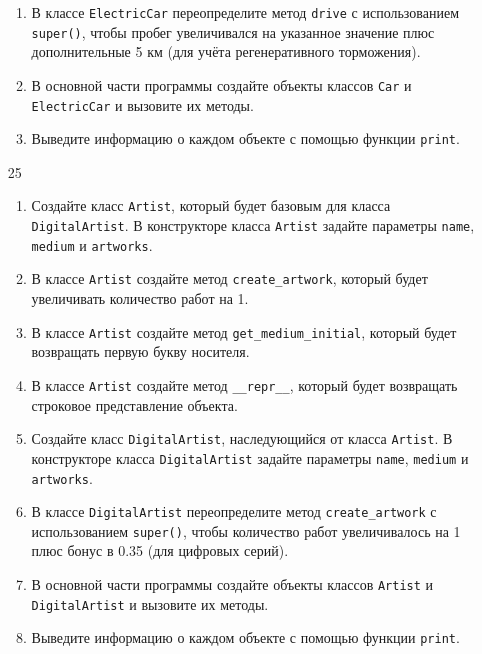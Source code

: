 \begin{enumerate}
\begin{enumerate}[leftmargin=*]
    \item В классе \texttt{ElectricCar} переопределите метод \texttt{drive} с использованием \texttt{super()}, чтобы пробег увеличивался на указанное значение плюс дополнительные 5 км (для учёта регенеративного торможения).
    
    \item В основной части программы создайте объекты классов \texttt{Car} и \texttt{ElectricCar} и вызовите их методы.
    
    \item Выведите информацию о каждом объекте с помощью функции \texttt{print}.
\end{enumerate}

\item[25] 
\begin{enumerate}[leftmargin=*]
    \item Создайте класс \texttt{Artist}, который будет базовым для класса \texttt{DigitalArtist}. В конструкторе класса \texttt{Artist} задайте параметры \texttt{name}, \texttt{medium} и \texttt{artworks}.
    
    \item В классе \texttt{Artist} создайте метод \texttt{create\_artwork}, который будет увеличивать количество работ на 1.
    
    \item В классе \texttt{Artist} создайте метод \texttt{get\_medium\_initial}, который будет возвращать первую букву носителя.
    
    \item В классе \texttt{Artist} создайте метод \texttt{\_\_repr\_\_}, который будет возвращать строковое представление объекта.
    
    \item Создайте класс \texttt{DigitalArtist}, наследующийся от класса \texttt{Artist}. В конструкторе класса \texttt{DigitalArtist} задайте параметры \texttt{name}, \texttt{medium} и \texttt{artworks}.
    
    \item В классе \texttt{DigitalArtist} переопределите метод \texttt{create\_artwork} с использованием \texttt{super()}, чтобы количество работ увеличивалось на 1 плюс бонус в 0.35 (для цифровых серий).
    
    \item В основной части программы создайте объекты классов \texttt{Artist} и \texttt{DigitalArtist} и вызовите их методы.
    
    \item Выведите информацию о каждом объекте с помощью функции \texttt{print}.
\end{enumerate}


\end{enumerate}
